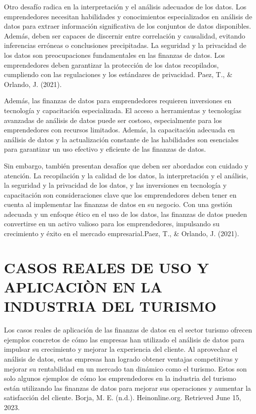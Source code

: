 \documentclass[
  letterpaper,
  DIV=11,
  numbers=noendperiod]{scrreprt}
\begin{document}
Otro desafío radica en la interpretación y el análisis adecuados de los
datos. Los emprendedores necesitan habilidades y conocimientos
especializados en análisis de datos para extraer información
significativa de los conjuntos de datos disponibles. Además, deben ser
capaces de discernir entre correlación y causalidad, evitando
inferencias erróneas o conclusiones precipitadas. La seguridad y la
privacidad de los datos son preocupaciones fundamentales en las finanzas
de datos. Los emprendedores deben garantizar la protección de los datos
recopilados, cumpliendo con las regulaciones y los estándares de
privacidad. Paez, T., \& Orlando, J. (2021).

Además, las finanzas de datos para emprendedores requieren inversiones
en tecnología y capacitación especializada. El acceso a herramientas y
tecnologías avanzadas de análisis de datos puede ser costoso,
especialmente para los emprendedores con recursos limitados. Además, la
capacitación adecuada en análisis de datos y la actualización constante
de las habilidades son esenciales para garantizar un uso efectivo y
eficiente de las finanzas de datos.

Sin embargo, también presentan desafíos que deben ser abordados con
cuidado y atención. La recopilación y la calidad de los datos, la
interpretación y el análisis, la seguridad y la privacidad de los datos,
y las inversiones en tecnología y capacitación son consideraciones clave
que los emprendedores deben tener en cuenta al implementar las finanzas
de datos en su negocio. Con una gestión adecuada y un enfoque ético en
el uso de los datos, las finanzas de datos pueden convertirse en un
activo valioso para los emprendedores, impulsando su crecimiento y éxito
en el mercado empresarial.Paez, T., \& Orlando, J. (2021).

\hypertarget{casos-reales-de-uso-y-aplicaciuxf2n-en-la-industria-del-turismo}{%
\section{CASOS REALES DE USO Y APLICACIÒN EN LA INDUSTRIA DEL
TURISMO}\label{casos-reales-de-uso-y-aplicaciuxf2n-en-la-industria-del-turismo}}

Los casos reales de aplicación de las finanzas de datos en el sector
turismo ofrecen ejemplos concretos de cómo las empresas han utilizado el
análisis de datos para impulsar su crecimiento y mejorar la experiencia
del cliente. Al aprovechar el análisis de datos, estas empresas han
logrado obtener ventajas competitivas y mejorar su rentabilidad en un
mercado tan dinámico como el turismo. Estos son solo algunos ejemplos de
cómo los emprendedores en la industria del turismo están utilizando las
finanzas de datos para mejorar sus operaciones y aumentar la
satisfacción del cliente. Borja, M. E. (n.d.). Heinonline.org. Retrieved
June 15, 2023.
\end{document}
